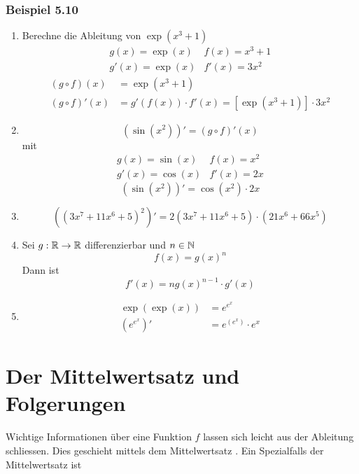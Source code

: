 \subsubsection*{Beispiel 5.10}
\begin{enumerate}
\item Berechne die Ableitung von $\exp\left( x^3+1\right)$
\[\begin{array}{*{20}{l}}
{g\left( x \right) = \exp \left( x \right)}&{f\left( x \right) = {x^3} + 1}\\
{g'\left( x \right) = \exp \left( x \right)}&{f'\left( x \right) = 3{x^2}}
\end{array}\]
\begin{align*}
\left( g\circ f\right) \left( x\right) &= \exp\left( x^3+1\right)\\
\left( g\circ f\right)' \left( x\right) &= g'\left( f\left( x\right)\right)\cdot f'\left( x\right)=\left[ \exp\left( x^3+1\right) \right]\cdot 3x^2
\end{align*}
\item \[ \left( \sin\left( x^2\right) \right)'=\left( g\circ f\right)'\left( x\right)\] mit
\[\begin{array}{*{20}{l}}
{g\left( x \right) = \sin \left( x \right)}&{f\left( x \right) = {x^2}}\\
{g'\left( x \right) = \cos \left( x \right)}&{f'\left( x \right) = 2x}
\end{array}\]
\[\left( \sin\left( x^2\right) \right)'=\cos\left( x^2\right)\cdot 2x\]
\item \[\left( {{{\left( {3{x^7} + 11{x^6} + 5} \right)}^2}} \right)' = 2\left( {3{x^7} + 11{x^6} + 5} \right) \cdot \left( {21{x^6} + 66{x^5}} \right)\]
\item Sei $g:\mathbb{R}\to\mathbb{R}$ differenzierbar und $n\in\mathbb{N}$ \[ f\left( x\right) = g\left( x\right)^n\]
Dann ist \[f'\left( x\right)=ng\left( x\right)^{n-1}\cdot g'\left( x\right)\]
\item \begin{align*}
\exp\left( \exp\left( x\right)\right)&=e^{e^x}\\
\left( e^{e^x}\right)'&=e^{\left( e^x\right)}\cdot e^x
\end{align*}
\end{enumerate}

\section{Der Mittelwertsatz und Folgerungen}
Wichtige Informationen über eine Funktion $f$ lassen sich leicht aus der Ableitung schliessen. Dies geschieht mittels dem Mittelwertsatz . Ein Spezialfalls der Mittelwertsatz ist

